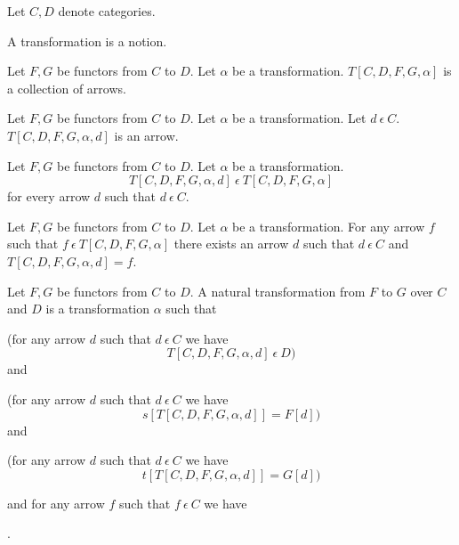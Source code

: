 \documentclass{article}
\newcommand{\inn}{~\epsilon~}
\newcommand{\innn}{~\epsilon~} %
\begin{document}
	\begin{forthel}
		
		Let $C,D$ denote categories.
		
		\begin{signature} A transformation is a notion.
		\end{signature}
		
		\begin{signature} Let $F,G$ be functors from $C$ to $D$. Let $\alpha$ be a transformation.
			$T[C,D,F,G,\alpha]$ is a collection of arrows.
		\end{signature}
		
		\begin{signature} Let $F,G$ be functors from $C$ to $D$. Let $\alpha$ be a transformation. Let $d \innn C$.
			$T[C,D,F,G,\alpha,d]$ is an arrow.
		\end{signature}
		
		\begin{axiom}
			Let $F,G$ be functors from $C$ to $D$. Let $\alpha$ be a transformation.
			$$T[C,D,F,G,\alpha,d] \inn T[C,D,F,G,\alpha]$$ for every arrow $d$ such that $d \inn C$.
		\end{axiom}
		
		\begin{axiom}
		  Let $F,G$ be functors from $C$ to $D$. Let $\alpha$ be a transformation.
			For any arrow $f$ such that $f \inn T[C,D,F,G,\alpha]$ there exists an arrow $d$ such that
			$d \inn C$ and $T[C,D,F,G,\alpha,d] = f$.
		\end{axiom}
		

		
		\begin{definition} 
			Let $F,G$ be functors from $C$ to $D$. 
			A natural transformation from $F$ to $G$ over $C$ and $D$ is a transformation $\alpha$ such that 
			
			(for any arrow $d$ such that $d \inn C$ we have
			$$T[C,D,F,G,\alpha,d] \inn D)$$ and 

			(for any arrow $d$ such that $d \inn C$ we have $$s[T[C,D,F,G,\alpha,d]] = F[d])$$ and 

			(for any arrow $d$ such that $d \inn C$ we have $$t[T[C,D,F,G,\alpha,d]] = G[d])$$
			
			and for any arrow $f$ such that $f \inn C$ we have
			\begin{center}
				.
			\end{center}
		\end{definition}
		

\end{forthel}
\end{document}
